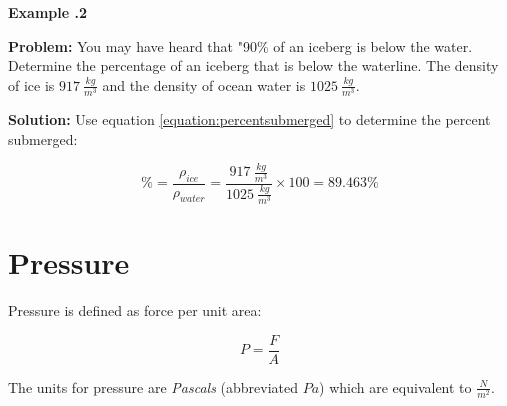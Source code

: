	\begin{mdframed}[backgroundcolor=blue!10!white]
		\begin{center}
			
			
			\textbf{Example \thesection.2}	
		\end{center}
		
		\textbf{Problem: } You may have heard that "90\% of an iceberg is below the water.  Determine the percentage of an iceberg that is below the waterline.  The density of ice is $\SI{917}{\frac{kg}{m^3}}$ and the density of ocean water is $\SI{1025}{\frac{kg}{m^3}}$.
		\vspace{0.1in}
		
		\textbf{Solution:} Use equation \ref{equation:percentsubmerged} to determine the percent submerged:  
	

		
		\begin{equation*}
		\% = \frac{\rho_{ice}}{\rho_{water}} = \frac{\SI{917}{\frac{kg}{m^3}}}{\SI{1025}{\frac{kg}{m^3}}} \times 100 = 89.463\%
		\end{equation*}
		
	\end{mdframed}
	\vspace{0.1in}
	
	
	
	\section{Pressure}
	Pressure is defined as force per unit area: 
	
			\begin{mdframed}[backgroundcolor=orange!20!white]
		\begin{equation}
			P = \frac{F}{A}
			\label{equation:pressure}
		\end{equation}
	\end{mdframed}	

The units for pressure are \textit{Pascals} (abbreviated $\si{Pa}$) which are equivalent to $\si{\frac{N}{m^2}}$.
\newpage

